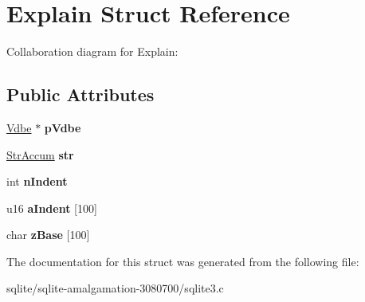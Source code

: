 \hypertarget{struct_explain}{\section{Explain Struct Reference}
\label{struct_explain}
}


Collaboration diagram for Explain\+:
\subsection*{Public Attributes}
\begin{DoxyCompactItemize}
\item 
\hypertarget{struct_explain_a5b40aff5e9132f568c01f5790c69cc89}{\hyperlink{struct_vdbe}{Vdbe} $\ast$ {\bfseries p\+Vdbe}}\label{struct_explain_a5b40aff5e9132f568c01f5790c69cc89}

\item 
\hypertarget{struct_explain_af92c731731b19685b567d29493f1e83e}{\hyperlink{struct_str_accum}{Str\+Accum} {\bfseries str}}\label{struct_explain_af92c731731b19685b567d29493f1e83e}

\item 
\hypertarget{struct_explain_a5420e5a4c88050c6536328612fcad2b7}{int {\bfseries n\+Indent}}\label{struct_explain_a5420e5a4c88050c6536328612fcad2b7}

\item 
\hypertarget{struct_explain_ac80869acc619d982c3246134678b4d6e}{u16 {\bfseries a\+Indent} \mbox{[}100\mbox{]}}\label{struct_explain_ac80869acc619d982c3246134678b4d6e}

\item 
\hypertarget{struct_explain_a1ac782f9829311d6b85edc1707ef8d41}{char {\bfseries z\+Base} \mbox{[}100\mbox{]}}\label{struct_explain_a1ac782f9829311d6b85edc1707ef8d41}

\end{DoxyCompactItemize}


The documentation for this struct was generated from the following file\+:\begin{DoxyCompactItemize}
\item 
sqlite/sqlite-\/amalgamation-\/3080700/sqlite3.\+c\end{DoxyCompactItemize}
